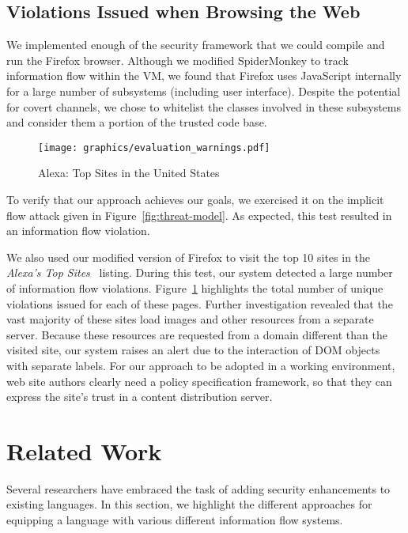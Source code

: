 \documentclass{llncs}
\begin{document}
\subsection{Violations Issued when Browsing the Web}
We implemented enough of the security framework that we could compile and run the Firefox browser.
Although we modified SpiderMonkey to track information flow within the VM, we found that Firefox uses JavaScript internally for a large number of subsystems (including user interface).
Despite the potential for covert channels, we chose to whitelist the classes involved in these subsystems and consider them a portion of the trusted code base.

\begin{figure}[ht]
  \centerline{\texttt{[image: graphics/evaluation\_warnings.pdf]}}
  \caption{Alexa: Top Sites in the United States~\cite{alexa}}
  \label{fig:warnings}
\end{figure}

To verify that our approach achieves our goals, we exercised it on the implicit flow attack given in Figure~\ref{fig:threat-model}.
As expected, this test resulted in an information flow violation.

We also used our modified version of Firefox to visit the top 10 sites in the \textit{Alexa's Top Sites}~\cite{alexa} listing.
During this test, our system detected a large number of information flow violations.
Figure~\ref{fig:warnings} highlights the total number of unique violations issued for each of these pages.
Further investigation revealed that the vast majority of these sites load images and other resources from a separate server.
Because these resources are requested from a domain different than the visited site, our system raises an alert due to the interaction of DOM objects with separate labels.
For our approach to be adopted in a working environment, web site authors clearly need a policy specification framework, so that they can express the site's trust in a content distribution server.


\section{Related Work}
\label{sec:relatedwork}

Several researchers have embraced the task of adding security enhancements to existing languages.
In this section, we highlight the different approaches for equipping a language with various different information flow systems.
\end{document}
